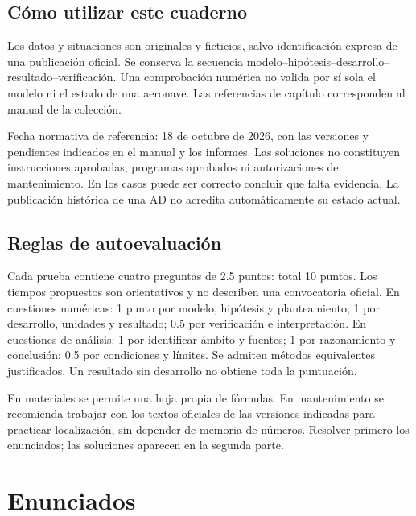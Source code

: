
\frontmatter
{}
\chapter*{Cómo utilizar este cuaderno}
Los datos y situaciones son originales y ficticios, salvo identificación expresa de una publicación oficial. Se conserva la secuencia modelo--hipótesis--desarrollo--resultado--verificación. Una comprobación numérica no valida por sí sola el modelo ni el estado de una aeronave. Las referencias de capítulo corresponden al manual de la colección.

Fecha normativa de referencia: 18 de octubre de 2026, con las versiones y pendientes indicados en el manual y los informes. Las soluciones no constituyen instrucciones aprobadas, programas aprobados ni autorizaciones de mantenimiento. En los casos puede ser correcto concluir que falta evidencia. La publicación histórica de una AD no acredita automáticamente su estado actual.
\bigskip\creditosportada
\tableofcontents\mainmatter
\chapter*{Reglas de autoevaluación}
Cada prueba contiene cuatro preguntas de 2.5 puntos: total 10 puntos. Los tiempos propuestos son orientativos y no describen una convocatoria oficial. En cuestiones numéricas: 1 punto por modelo, hipótesis y planteamiento; 1 por desarrollo, unidades y resultado; 0.5 por verificación e interpretación. En cuestiones de análisis: 1 por identificar ámbito y fuentes; 1 por razonamiento y conclusión; 0.5 por condiciones y límites. Se admiten métodos equivalentes justificados. Un resultado sin desarrollo no obtiene toda la puntuación.

En materiales se permite una hoja propia de fórmulas. En mantenimiento se recomienda trabajar con los textos oficiales de las versiones indicadas para practicar localización, sin depender de memoria de números. Resolver primero los enunciados; las soluciones aparecen en la segunda parte.
\part{Enunciados}
